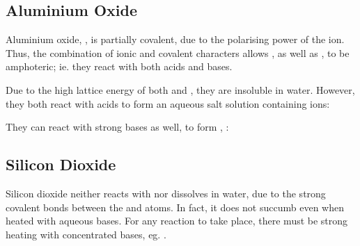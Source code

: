 


		\pagebreak
		\subsection{Aluminium Oxide}

			Aluminium oxide, , is partially covalent, due to the polarising power of the  ion. Thus, the combination of
			ionic and covalent characters allows , as well as , to be amphoteric; ie. they react with both acids and
			bases.

			Due to the high lattice energy of both  and , they are insoluble in water. However, they both react
			with acids to form an aqueous salt solution containing  ions:


			They can react with strong bases as well, to form , \ch{[\Al(OH)4]-}:





		\subsection{Silicon Dioxide}

			Silicon dioxide neither reacts with nor dissolves in water, due to the strong covalent bonds between the  and  atoms.
			In fact, it does not succumb even when heated with aqueous bases. For any reaction to take place, there must be strong heating
			with concentrated bases, eg. .


